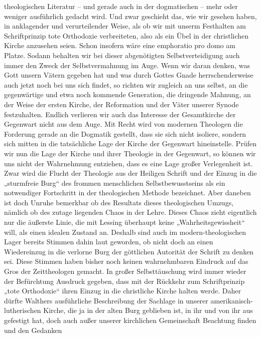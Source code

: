theologischen Literatur – und gerade auch in der dogmatischen – mehr oder weniger ausführlich gedacht wird. Und zwar geschieht das, wie wir gesehen haben, in anklagender und verurteilender Weise, als ob wir mit unserm Festhalten am Schriftprinzip tote Orthodoxie verbreiteten, also als ein Übel in der christlichen Kirche anzusehen seien. Schon insofern wäre eine 
emph{oratio pro domo}
am Platze. Sodann behalten wir bei dieser abgenötigten Selbstverteidigung auch immer den Zweck der Selbstvermahnung im Auge. Wenn wir daran denken, was Gott unsern Vätern gegeben hat und was durch Gottes Gnade herrschenderweise auch jetzt noch bei uns sich findet, so richten wir zugleich an uns selbst, an die gegenwärtige und etwa noch kommende Generation, die dringende Mahnung, an der Weise der ersten Kirche, der Reformation und der Väter unserer Synode festzuhalten. Endlich verlieren wir auch das Interesse der Gesamtkirche der Gegenwart nicht aus dem Auge. Mit Recht wird von modernen Theologen die Forderung gerade an die Dogmatik gestellt, dass sie sich nicht isoliere, sondern sich mitten in die tatsächliche Lage der Kirche der Gegenwart hineinstelle. Prüfen wir nun die Lage der Kirche und ihrer Theologie in der Gegenwart, so können wir uns nicht der Wahrnehmung entziehen, dass es eine Lage großer Verlegenheit ist. Zwar wird die Flucht der Theologie aus der Heiligen Schrift und der Einzug in die „sturmfreie Burg“ des frommen menschlichen Selbstbewusstseins als ein notwendiger Fortschritt in der theologischen Methode bezeichnet. Aber daneben ist doch Unruhe bemerkbar ob des Resultats dieses theologischen Umzugs, nämlich ob des zutage liegenden Chaos in der Lehre. Dieses Chaos zieht eigentlich nur die äußerste Linie, die mit Lessing überhaupt keine „Wahrheitsgewissheit“ will, als einen idealen Zustand an. Deshalb sind auch im modern-theologischen Lager bereits Stimmen dahin laut geworden, ob nicht doch an einen Wiedereinzug in die verlorne Burg der göttlichen Autorität der Schrift zu denken sei. Diese Stimmen haben bisher noch keinen wahrnehmbaren Eindruck auf das Gros der Zeittheologen gemacht. In großer Selbsttäuschung wird immer wieder der Befürchtung Ausdruck gegeben, dass mit der Rückkehr zum Schriftprinzip „tote Orthodoxie“ ihren Einzug in die christliche Kirche halten werde. Daher dürfte Walthers ausführliche Beschreibung der Sachlage in unserer amerikanisch-lutherischen Kirche, die ja in der alten Burg geblieben ist, in ihr und von ihr aus gefestigt hat, doch auch außer unserer kirchlichen Gemeinschaft Beachtung finden und den Gedanken